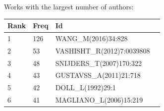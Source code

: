 \documentclass[hyperref={pdfstartview={FitBH -32768},
                         pdfpagemode=FullScreen,
                         plainpages=false,
                         colorlinks=true}
              ]{beamer}
\begin{document}
\begin{frame}[fragile]
\footnotesize
Works with the largest number of authors:
\begin{center}
\renewcommand{\arraystretch}{0.82}
\tiny 
\begin{tabular}{l|l|l|l|}
     Rank    & Freq & Id \\ \hline
         1   & 126  & WANG\_M(2016)34:828 \\
         2    & 53   & VASHISHT\_R(2012)7:0039808 \\ 
         3      & 48  & SNIJDERS\_T(2007)170:322 \\ 
         4     & 43  & GUSTAVSS\_A(2011)21:718  \\ 
         5    & 42   & DOLL\_L(1992)29:1 \\ 
         6   &41 &  MAGLIANO\_L(2006)15:219 \\ \hline
\end{tabular}
\end{center}

\end{frame}
\end{document}
